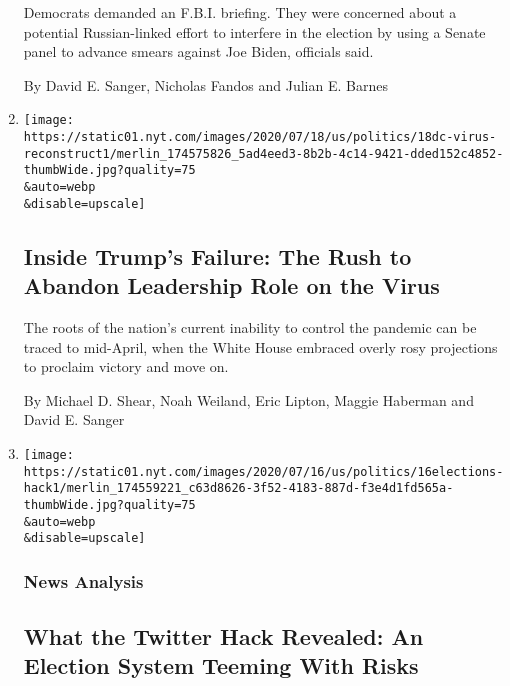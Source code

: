 \begin{enumerate}
  Democrats demanded an F.B.I. briefing. They were concerned about a
  potential Russian-linked effort to interfere in the election by using
  a Senate panel to advance smears against Joe Biden, officials said.

  By David E. Sanger, Nicholas Fandos and Julian E. Barnes
\item
  \href{/2020/07/18/us/politics/trump-coronavirus-response-failure-leadership.html}{}

  \texttt{[image: https://static01.nyt.com/images/2020/07/18/us/politics/18dc-virus-reconstruct1/merlin\_174575826\_5ad4eed3-8b2b-4c14-9421-dded152c4852-thumbWide.jpg?quality=75\\\&auto=webp\\\&disable=upscale]}

  \hypertarget{inside-trumps-failure-the-rush-to-abandon-leadership-role-on-the-virus}{%
  \subsection{Inside Trump's Failure: The Rush to Abandon Leadership
  Role on the
  Virus}\label{inside-trumps-failure-the-rush-to-abandon-leadership-role-on-the-virus}}

  The roots of the nation's current inability to control the pandemic
  can be traced to mid-April, when the White House embraced overly rosy
  projections to proclaim victory and move on.

  By Michael D. Shear, Noah Weiland, Eric Lipton, Maggie Haberman and
  David E. Sanger
\item
  \href{/2020/07/16/us/politics/twitter-hack.html}{}

  \texttt{[image: https://static01.nyt.com/images/2020/07/16/us/politics/16elections-hack1/merlin\_174559221\_c63d8626-3f52-4183-887d-f3e4d1fd565a-thumbWide.jpg?quality=75\\\&auto=webp\\\&disable=upscale]}

  \hypertarget{news-analysis-2}{%
  \subsubsection{News Analysis}\label{news-analysis-2}}

  \hypertarget{what-the-twitter-hack-revealed-an-election-system-teeming-with-risks}{%
  \subsection{What the Twitter Hack Revealed: An Election System Teeming
  With
  Risks}\label{what-the-twitter-hack-revealed-an-election-system-teeming-with-risks}}


\end{enumerate}
